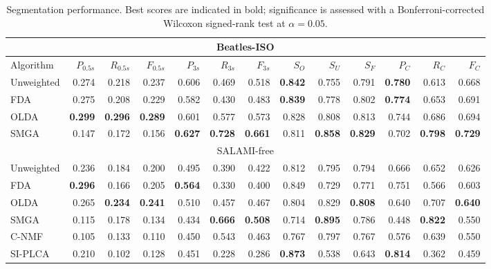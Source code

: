\begin{table*}
\centering
\caption{Segmentation performance. Best scores are indicated in bold; significance is assessed with a Bonferroni-corrected Wilcoxon
signed-rank test at $\alpha=0.05$.\label{tab:results}}
\footnotesize
\begin{tabular}{lrrrrrrrrrrrr}
\multicolumn{13}{c}{Beatles-ISO}\\
\toprule%
Algorithm   &   $P_{0.5s}$ & $R_{0.5s}$ & $F_{0.5s}$ & $P_{3s}$     & $R_{3s}$  & $F_{3s}$   & $S_O$ & $S_U$ & $S_F$ & $P_C$& $R_C$& $F_C$\\
\hline
Unweighted  & 
0.274 & 0.218 & 0.237 & 0.606 & 0.469 & 0.518 & \textbf{0.842} & 0.755 & 0.791 & \textbf{0.780} & 0.613 & 0.668\\
FDA         &  
0.275 & 0.208 & 0.229 & 0.582 & 0.430 & 0.483 & \textbf{0.839} & 0.778 & 0.802 & \textbf{0.774} & 0.653 & 0.691\\
OLDA        & 
\textbf{0.299} & \textbf{0.296} & \textbf{0.289} & 0.601 & 0.577 & 0.573 & 0.828 & 0.808 & 0.813 & 0.744 & 0.686 & 0.694\\
\hline
SMGA~\hfill\cite{serra2012unsupervised} &  
0.147 & 0.172 & 0.156 & \textbf{0.627} & \textbf{0.728} & \textbf{0.661} & 0.811 & \textbf{0.858} & \textbf{0.829} & 0.702 &
\textbf{0.798} & \textbf{0.729}\\
\toprule%
\multicolumn{13}{c}{SALAMI-free}\\
\toprule%
Unweighted  & 
0.236 & 0.184 & 0.200 & 0.495 & 0.390 & 0.422 & 0.812 & 0.795 & 0.794 & 0.666 & 0.652 & 0.626\\
FDA     & 
\textbf{0.296} & 0.166 & 0.205 & \textbf{0.564} & 0.330 & 0.400 & 0.849 & 0.729 & 0.771 & 0.751 & 0.566 & 0.603\\
OLDA    & 
0.265 & \textbf{0.234} & \textbf{0.241} & 0.510 & 0.457 & 0.467 & 0.804 & 0.829 & \textbf{0.808} & 0.640 & 0.707 & \textbf{0.640}\\
\hline
SMGA~\hfill\cite{serra2012unsupervised} &
0.115 & 0.178 & 0.134 & 0.434 & \textbf{0.666} & \textbf{0.508} & 0.714 & \textbf{0.895} & 0.786 & 0.448 & \textbf{0.822} & 0.550\\
C-NMF~\hfill\cite{nieto2013convex}  &
0.105 & 0.133 & 0.110 & 0.450 & 0.543 & 0.463 & 0.767 & 0.797 & 0.767 & 0.576 & 0.639 & 0.550\\
SI-PLCA~\hfill\cite{weiss2011unsupervised}  &
0.210 & 0.102 & 0.128 & 0.451 & 0.228 & 0.286 & \textbf{0.873} & 0.538 & 0.643 & \textbf{0.814} & 0.362 & 0.459\\
\bottomrule%
\end{tabular}
\end{table*}
